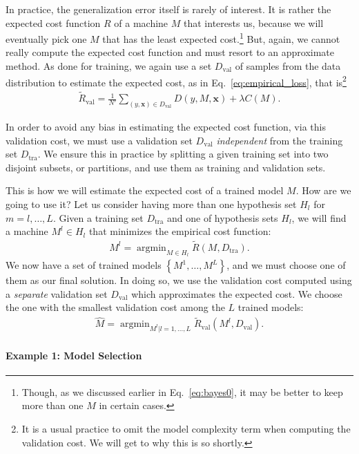 \documentclass{report}
\newcommand{\vect}[1]{\mathbf{#1}}
\newcommand{\vx}[0]{\vect{x}}
\DeclareMathOperator*{\argmin}{\arg \min}
\newcommand{\val}{\text{val}}
\newcommand{\tra}{\text{tra}}
\begin{document}
In practice, the generalization error itself is rarely of interest. It is rather
the expected cost function $R$ of a machine $M$ that interests us, because we
will eventually pick one $M$ that has the least expected cost.\footnote{
    Though, as we discussed earlier in Eq.~\eqref{eq:bayes0}, it may be better
    to keep more than one $M$ in certain cases. 
} But, again, we cannot really compute the expected cost function and must
resort to an approximate method. As done for training, we again use a set
$D_{\val}$ of samples from the data distribution to estimate the expected cost,
as in Eq.~\eqref{eq:empirical_loss}, that is\footnote{
    It is a usual practice to omit the model complexity term when computing the
    validation cost. We will get to why this is so shortly.
}
\begin{align*}
    \tilde{R}_{\val} = \frac{1}{N'} \sum_{(y, \vx) \in D_{\val}} D(y, M, \vx)
    + \lambda C(M).
\end{align*}

In order to avoid any bias in estimating the expected cost function, via this
validation cost, we must use a validation set $D_{\val}$ {\it independent} from
the training set $D_{\tra}$. We ensure this in practice by splitting a given
training set into two disjoint subsets, or partitions, and use them as training
and validation sets. 

This is how we will estimate the expected cost of a trained model $M$. How are
we going to use it? Let us consider having more than one hypothesis set $H_l$
for $m=l, \ldots, L$. Given a training set $D_{\tra}$ and one of hypothesis sets
$H_l$, we will find a machine $M^l \in H_l$ that minimizes the empirical cost
function:
\begin{align*}
    M^l = \argmin_{M \in H_l} \tilde{R}(M, D_{\tra}).
\end{align*}
We now have a set of trained models $\left\{ M^1, \ldots, M^L \right\}$, and we
must choose one of them as our final solution. In doing so, we use the
validation cost computed using a {\it separate} validation set $D_{\val}$ which
approximates the expected cost. We choose the one with the smallest validation
cost among the $L$ trained models:
\begin{align*}
    \hat{M} = \argmin_{M^l|l=1,\ldots,L} \tilde{R}_{\val}(M^l, D_{\val}).
\end{align*}

\paragraph{Example 1: Model Selection}
\end{document}
